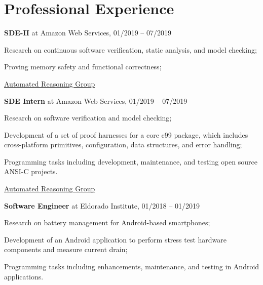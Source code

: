 \documentclass[letterpaper]{article}
\renewenvironment{itemize}{
  \begin{list}{}{
    \setlength{\leftmargin}{1.5em}
  }
}{
  \end{list}
}
\begin{document}
\section*{Professional Experience}

    \begin{enumerate}
       \item{{\bf SDE-II} at Amazon Web Services, 01/2019 -- 07/2019}
      \begin{itemize}
        \item{\textendash} {Research on continuous software verification, static analysis, and model checking;}
        \item{\textendash} {Proving memory safety and functional correctness;}
        \item{\textendash} \href{https://aws.amazon.com/security/provable-security/?sc_channel=EL&sc_campaign=Promo_2018_vid&sc_medium=YouTube&sc_content=video3507&sc_detail=CAREERS&sc_country=US}{Automated Reasoning Group}
      \end{itemize}
     \item{{\bf SDE Intern} at Amazon Web Services, 01/2019 -- 07/2019}
      \begin{itemize}
        \item{\textendash} {Research on software verification and model checking;}
        \item{\textendash} {Development of a set of proof harnesses for a core c99 package, which includes cross-platform primitives, configuration, data structures, and error handling;}
        \item{\textendash} {Programming tasks including development, maintenance, and testing open source ANSI-C projects.}
        \item{\textendash} \href{https://aws.amazon.com/security/provable-security/?sc_channel=EL&sc_campaign=Promo_2018_vid&sc_medium=YouTube&sc_content=video3507&sc_detail=CAREERS&sc_country=US}{Automated Reasoning Group}
      \end{itemize}
         \item{{\bf Software Engineer} at Eldorado Institute, 01/2018 -- 01/2019}
      \begin{itemize}
        \item{\textendash} {Research on battery management for Android-based smartphones;}
        \item{\textendash} {Development of an Android application to perform stress test hardware components and measure current drain;}
        \item{\textendash} {Programming tasks including enhancements, maintenance, and testing in Android applications.}

\end{itemize}
\end{enumerate}
\end{document}

